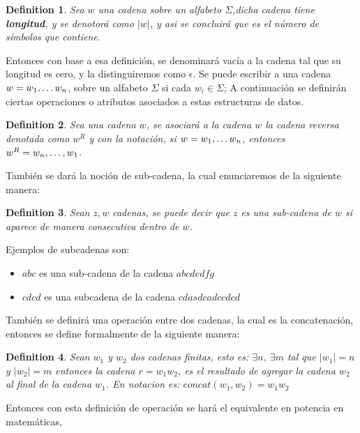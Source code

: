 \documentclass[10pt]{report}
\newtheorem{definition}{Definition}
\begin{document}
    \begin{definition}
        Sea $w$ una cadena sobre un alfabeto $\Sigma$,dicha cadena tiene \textbf{longitud},
        y se denotorá como $|w|$, y asi se concluirá que es el número de símbolos que contiene.

    \end{definition}
    Entonces con base a esa definición, se denominará vacía a la cadena tal que su longitud es cero, y la
    distinguiremos como $\epsilon$.\newline
    Se puede escribir a una cadena $w = w_{1},\mathellipsis w_{n}$, sobre un alfabeto $\Sigma$ si cada $w_{i} \in \Sigma$;
    \space
    A continuación se definirán ciertas operaciones o atributos asociados a estas estructuras de datos.
    \begin{definition}
        Sea una cadena $w$, se asociará a la cadena $w$ la cadena reversa denotada como $w^R$
        y con la notación, si $w = w_{1},\mathellipsis w_{n}$, entonces $w^{R} = w_{n},\mathellipsis,w_{1}$.
    \end{definition}
    También se dará la noción de sub-cadena, la cual enunciaremos de la siguiente manera:\newline
    \begin{definition}
        Sean $z,w$ cadenas, se puede decir que $z$ es una sub-cadena de $w$ si aparece de manera consecutiva dentro de $w$.
    \end{definition}
    Ejemplos de subcadenas son:
    \begin{itemize}
        \item $abc$ es una sub-cadena de la cadena $abcdedfg$
        \item $cdcd$ es una subcadena de la cadena $cdasdcadccdcd$
    \end{itemize}
    También se definirá una operación entre dos cadenas, la cual es
    la concatenación, entonces se define formalmente de la siguiente manera:\newline
    \begin{definition}
        Sean $w_{1}$ y $w_{2}$ dos cadenas finitas, esto es:\newline
        $\exists n,\ \exists m$ tal que $|w_{1}|=n$ y $|w_{2}|=m$
        entonces la cadena $r = w_{1}w_{2}$, es el resultado de agregar la cadena $w_{2}$ al final de la cadena
        $w_{1}$.\newline
        En notacion es: $concat(w_{1},w_{2}) = w_{1}w_{2}$
    \end{definition}
    Entonces con esta definición de operación se hará el equivalente en potencia en matemáticas,
\end{document}

